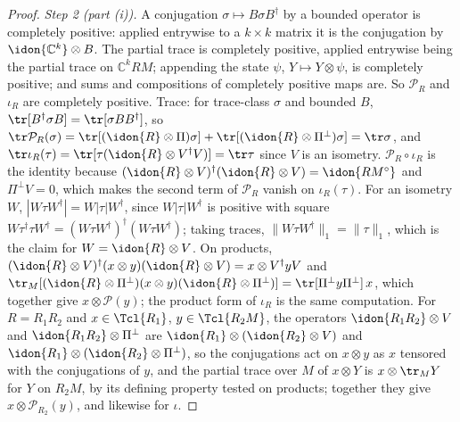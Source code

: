 \begin{proof}
\emph{Step 2 (part (i)).} A conjugation $\sigma\mapsto B\sigma B^{\dagger}$ by a
bounded operator is completely positive: applied entrywise to a
$k\times k$ matrix it is the conjugation by $\idon{\mathbb{C}^k}\otimes B$. The
partial trace is completely positive, applied entrywise being the partial
trace on $\mathbb{C}^kRM$; appending the state $\psi$, $Y\mapsto Y\otimes\psi$,
is completely positive; and sums and compositions of completely positive maps
are. So $\mathcal{P}_R$ and $\iota_R$ are completely positive. Trace: for
trace-class $\sigma$ and bounded $B$, $\tr[B^{\dagger}\sigma B]=\tr[\sigma
BB^{\dagger}]$, so
$\tr\mathcal{P}_R(\sigma)=\tr[(\idon{R}\otimes\Pi)\sigma]
+\tr[(\idon{R}\otimes\Pi^{\perp})\sigma]=\tr\sigma$, and
$\tr\iota_R(\tau)=\tr[\tau(\idon{R}\otimes V^{\dagger}V)]=\tr\tau$ since $V$ is an
isometry. $\mathcal{P}_R\circ\iota_R$ is the identity because
$(\idon{R}\otimes V)^{\dagger}(\idon{R}\otimes V)=\idon{RM^{\circ}}$ and
$\Pi^{\perp}V=0$, which makes the second term of $\mathcal{P}_R$ vanish on
$\iota_R(\tau)$. For an isometry $W$, $|W\tau W^{\dagger}|=W|\tau|W^{\dagger}$,
since $W|\tau|W^{\dagger}$ is positive with square
$W\tau^{\dagger}\tau W^{\dagger}=(W\tau W^{\dagger})^{\dagger}(W\tau W^{\dagger})$;
taking traces, $\|W\tau W^{\dagger}\|_1=\|\tau\|_1$, which is the claim for
$W=\idon{R}\otimes V$. On products,
$(\idon{R}\otimes V)^{\dagger}(x\otimes y)(\idon{R}\otimes V)=x\otimes
V^{\dagger}yV$ and
$\tr_M[(\idon{R}\otimes\Pi^{\perp})(x\otimes y)(\idon{R}\otimes\Pi^{\perp})]
=\tr[\Pi^{\perp}y\Pi^{\perp}]\,x$, which together give
$x\otimes\mathcal{P}(y)$; the product form of $\iota_R$ is the same
computation. For $R=R_1R_2$ and $x\in\Tcl{R_1}$, $y\in\Tcl{R_2M}$, the
operators $\idon{R_1R_2}\otimes V$ and $\idon{R_1R_2}\otimes\Pi^{\perp}$ are
$\idon{R_1}\otimes(\idon{R_2}\otimes V)$ and
$\idon{R_1}\otimes(\idon{R_2}\otimes\Pi^{\perp})$, so the conjugations act on
$x\otimes y$ as $x$ tensored with the conjugations of $y$, and the partial
trace over $M$ of $x\otimes Y$ is $x\otimes\tr_M Y$ for $Y$ on $R_2M$, by its
defining property tested on products; together they give
$x\otimes\mathcal{P}_{R_2}(y)$, and likewise for $\iota$.


\end{proof}

